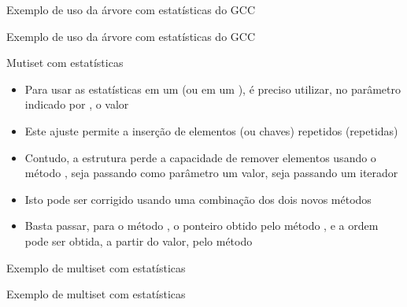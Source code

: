 \begin{frame}[fragile]{Exemplo de uso da árvore com estatísticas do GCC}
\end{frame}

\begin{frame}[fragile]{Exemplo de uso da árvore com estatísticas do GCC}
\end{frame}

\begin{frame}[fragile]{Mutiset com estatísticas}

    \begin{itemize}
        \item Para usar as estatísticas em um  (ou em um ),
            é preciso utilizar, no parâmetro indicado por , o valor

        \item Este ajuste permite a inserção de elementos (ou chaves) repetidos (repetidas)

        \item Contudo, a estrutura perde a capacidade de remover elementos usando o método
            , seja passando como parâmetro um valor, seja passando um iterador

        \item Isto pode ser corrigido usando uma combinação dos dois novos métodos

        \item Basta passar, para o método , o ponteiro obtido pelo método
            , e a ordem pode ser obtida, a partir do valor,
            pelo método 
    \end{itemize}
\end{frame}

\begin{frame}[fragile]{Exemplo de multiset com estatísticas}
\end{frame}

\begin{frame}[fragile]{Exemplo de multiset com estatísticas}
\end{frame}
